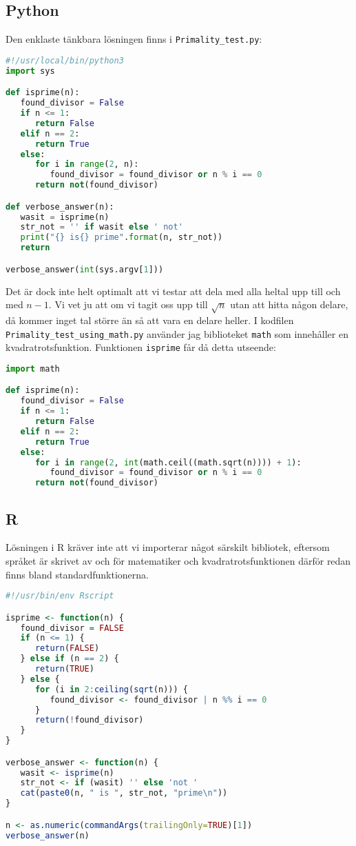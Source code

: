 \documentclass[10pt, twoside,a4paper]{article}
\begin{document}
\subsection{Python}
Den enklaste tänkbara lösningen finns i \verb+Primality_test.py+:
\begin{lstlisting}[language=python]
#!/usr/local/bin/python3
import sys

def isprime(n):
   found_divisor = False
   if n <= 1:
      return False
   elif n == 2:
      return True
   else:
      for i in range(2, n):
         found_divisor = found_divisor or n % i == 0
      return not(found_divisor)

def verbose_answer(n):
   wasit = isprime(n)
   str_not = '' if wasit else ' not' 
   print("{} is{} prime".format(n, str_not))
   return

verbose_answer(int(sys.argv[1]))
\end{lstlisting}
Det är dock inte helt optimalt att vi testar att dela med alla heltal upp till och med $n-1$. Vi vet ju att om vi tagit oss upp till $\sqrt{n}$ utan att hitta någon delare, då kommer inget tal större än så att vara en delare heller. I kodfilen \verb+Primality_test_using_math.py+ använder jag biblioteket \verb+math+ som innehåller en kvadratrotsfunktion. Funktionen \verb+isprime+ får då detta utseende:
\begin{lstlisting}[language=python]
import math

def isprime(n):
   found_divisor = False
   if n <= 1:
      return False
   elif n == 2:
      return True
   else:
      for i in range(2, int(math.ceil((math.sqrt(n)))) + 1):
         found_divisor = found_divisor or n % i == 0
      return not(found_divisor)
\end{lstlisting}

\newpage
\subsection{R}
Lösningen i R kräver inte att vi importerar något särskilt bibliotek, eftersom språket är skrivet av och för matematiker och kvadratrotsfunktionen därför redan finns bland standardfunktionerna.
\begin{lstlisting}[language=R]
#!/usr/bin/env Rscript

isprime <- function(n) {
   found_divisor = FALSE
   if (n <= 1) {
      return(FALSE)
   } else if (n == 2) {
      return(TRUE)
   } else {
      for (i in 2:ceiling(sqrt(n))) {
         found_divisor <- found_divisor | n %% i == 0
      }
      return(!found_divisor)
   }
}

verbose_answer <- function(n) {
   wasit <- isprime(n)
   str_not <- if (wasit) '' else 'not '
   cat(paste0(n, " is ", str_not, "prime\n"))
}

n <- as.numeric(commandArgs(trailingOnly=TRUE)[1])
verbose_answer(n)
\end{lstlisting}
\end{document}
